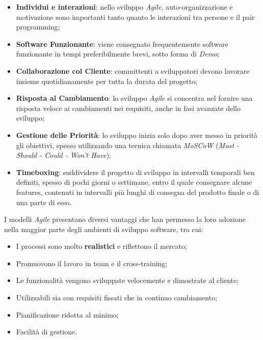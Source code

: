 \documentclass[../main.tex]{subfiles}
\begin{document}
        		\begin{itemize}
        			\item \textbf{Individui e interazioni}: nello sviluppo \emph{Agile}, auto-organizzazione e motivazione sono importanti tanto quanto le interazioni tra persone e il pair programming;
        			\item \textbf{Software Funzionante}: viene consegnato frequentemente software funzionante in tempi preferibilmente brevi, sotto forma di \emph{Demo};
        			\item \textbf{Collaborazione col Cliente}: committenti a sviluppatori devono lavorare insieme quotidianamente per tutta la durata del progetto;
        			\item \textbf{Risposta al Cambiamento}: lo sviluppo \emph{Agile} si concentra nel fornire una risposta veloce ai cambiamenti nei requisiti, anche in fasi avanzate dello sviluppo;
        			\item \textbf{Gestione delle Priorità}: lo sviluppo inizia solo dopo aver messo in priorità gli obiettivi, spesso utilizzando una tecnica chiamata \emph{MoSCoW} (\emph{Must - Should - Could - Won't Have});
        			\item \textbf{Timeboxing}: suddividere il progetto di sviluppo in intervalli temporali ben definiti, spesso di pochi giorni o settimane, entro il quale consegnare alcune features, contenuti in intervalli più lunghi di consegna del prodotto finale o di una parte di esso.
        		\end{itemize}
        	
        		I modelli \emph{Agile} presentano diversi vantaggi che han permesso la loro adozione nella maggior parte degli ambienti di sviluppo software, tra cui:
        		\begin{itemize}
        			\item I processi sono molto \textbf{realistici} e riflettono il mercato;
        			\item Promuovono il lavoro in team e il cross-training;
        			\item Le funzionalità vengono sviluppate velocemente e dimostrate al cliente;
        			\item Utilizzabili sia con requisiti fissati che in continuo cambiamento;
        			\item Pianificazione ridotta al minimo;
        			\item Facilità di gestione.
        		\end{itemize}
        	
\end{document}
